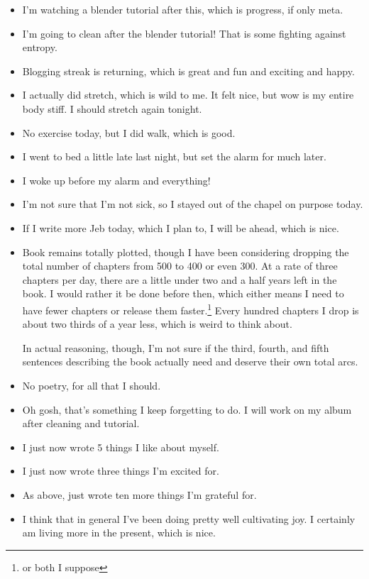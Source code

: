 \documentclass[12pt]{article}[titlepage]
\newcommand{\1}{\={a}}
\newcommand{\2}{\={e}}
\newcommand{\3}{\={\i}}
\newcommand{\4}{\=o}
\newcommand{\5}{\=u}
\newcommand{\6}{\={A}}
\renewcommand{\,}{\textsuperscript{,}}
\begin{document}
\begin{itemize}
\item I'm watching a blender tutorial after this, which is progress, if only meta.
\item I'm going to clean after the blender tutorial! That is some fighting against entropy.
\item Blogging streak is returning, which is great and fun and exciting and happy.
\item I actually did stretch, which is wild to me. It felt nice, but wow is my entire body stiff. I should stretch again tonight.
\item No exercise today, but I did walk, which is good.
\item I went to bed a little late last night, but set the alarm for much later.
\item I woke up before my alarm and everything!
\item I'm not sure that I'm not sick, so I stayed out of the chapel on purpose today.
\item If I write more Jeb today, which I plan to, I will be ahead, which is nice.
\item Book remains totally plotted, though I have been considering dropping the total number of chapters from 500 to 400 or even 300.
At a rate of three chapters per day, there are a little under two and a half years left in the book.
I would rather it be done before then, which either means I need to have fewer chapters or release them faster.\footnote{or both I suppose}
Every hundred chapters I drop is about two thirds of a year less, which is weird to think about.

In actual reasoning, though, I'm not sure if the third, fourth, and fifth sentences describing the book actually need and deserve their own total arcs.
\item No poetry, for all that I should.
\item Oh gosh, that's something I keep forgetting to do.
I will work on my album after cleaning and tutorial.
\item I just now wrote 5 things I like about myself.
\item I just now wrote three things I'm excited for.
\item As above, just wrote ten more things I'm grateful for.
\item I think that in general I've been doing pretty well cultivating joy.
I certainly am living more in the present, which is nice.
\end{itemize}
\end{document}
